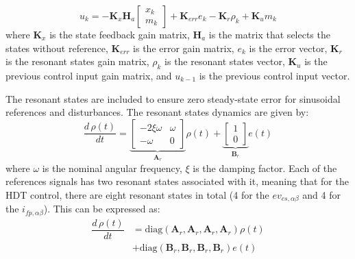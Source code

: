\begin{equation}
    u_k = -\mathbf{K}_x \mathbf{H}_a
    \begin{bmatrix}
        x_k\\
        m_k
    \end{bmatrix} + \mathbf{K}_{err}e_k - \mathbf{K}_r \rho_k + \mathbf{K}_u m_k
\end{equation}
where $\mathbf{K}_x$ is the state feedback gain matrix, $\mathbf{H}_a$ is the matrix that selects the states without reference, $\mathbf{K}_{err}$ is the error gain matrix, $e_k$ is the error vector, $\mathbf{K}_r$ is the resonant states gain matrix, $\rho_k$ is the resonant states vector, $\mathbf{K}_u$ is the previous control input gain matrix, and $u_{k - 1}$ is the previous control input vector.

The resonant states are included to ensure zero steady-state error for sinusoidal references and disturbances. The resonant states dynamics are given by:
\begin{equation}
    \dfrac{d\,\rho(t)}{dt} = 
    \underbrace{
    \begin{bmatrix}
        -2\xi\omega & \omega \\
        -\omega & 0
    \end{bmatrix}
    }_{\mathbf{A}_r}
    \rho(t) + 
    \underbrace{
    \begin{bmatrix}
        1\\
        0
    \end{bmatrix}
    }_{\mathbf{B}_r}
    e(t)
\end{equation}
where $\omega$ is the nominal angular frequency, $\xi$ is the damping factor. Each of the references signals has two resonant states associated with it, meaning that for the HDT control, there are eight resonant states in total (4 for the $ev_{cs,\alpha\beta}$ and 4 for the $i_{fp,\alpha\beta}$). This can be expressed as:
\begin{align}
    \dfrac{d\,\rho(t)}{dt} &= \text{diag}(\mathbf{A}_r, \mathbf{A}_r, \mathbf{A}_r, \mathbf{A}_r)\rho(t)\\
    &+ \text{diag}(\mathbf{B}_r, \mathbf{B}_r, \mathbf{B}_r, \mathbf{B}_r)e(t)
\end{align}

